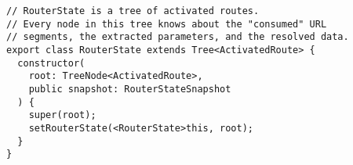 \begin{verbatim}
// RouterState is a tree of activated routes.
// Every node in this tree knows about the "consumed" URL
// segments, the extracted parameters, and the resolved data.
export class RouterState extends Tree<ActivatedRoute> {
  constructor(
    root: TreeNode<ActivatedRoute>,
    public snapshot: RouterStateSnapshot
  ) {
    super(root);
    setRouterState(<RouterState>this, root);
  }
}
\end{verbatim}
